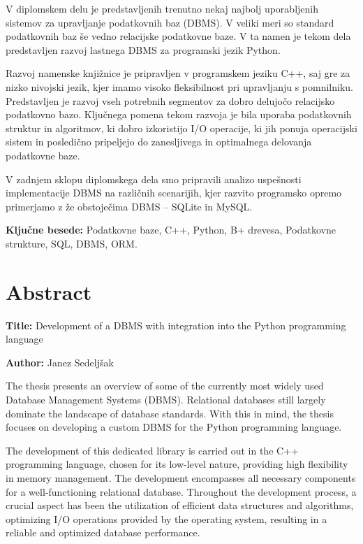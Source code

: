 \documentclass[a4paper,12pt,openright]{book}
\newcommand{\ttitleEn}{Development of a DBMS with integration into the Python programming language}
\newcommand{\tauthor}{Janez Sedeljšak}
\newcommand{\tkeywords}{Podatkovne baze, C++, Python, B+ drevesa, Podatkovne strukture, SQL, DBMS, ORM}
\newcommand{\clearemptydoublepage}{\newpage{\pagestyle{empty}\cleardoublepage}}
\begin{document}
\noindent V diplomskem delu je predstavljenih trenutno nekaj najbolj uporabljenih sistemov za upravljanje podatkovnih baz (DBMS). V veliki meri so standard podatkovnih baz še vedno relacijske podatkovne baze. V ta namen je tekom dela predstavljen razvoj lastnega DBMS za programski jezik Python.

Razvoj namenske knjižnice je pripravljen v programskem jeziku C++, saj gre za nizko nivojski jezik, kjer imamo visoko fleksibilnost pri upravljanju s pomnilniku. Predstavljen je razvoj vseh potrebnih segmentov za dobro delujočo relacijsko podatkovno bazo. Ključnega pomena tekom razvoja je bila uporaba podatkovnih struktur in algoritmov, ki dobro izkoristijo I/O operacije, ki jih ponuja operacijski sistem in posledično pripeljejo do zanesljivega in optimalnega delovanja podatkovne baze.

V zadnjem sklopu diplomskega dela smo pripravili analizo uspešnosti implementacije DBMS na različnih scenarijih, kjer razvito programsko opremo primerjamo z že obstoječima DBMS – SQLite in MySQL.
\bigskip

\noindent\textbf{Ključne besede:} \tkeywords.
\clearemptydoublepage

{}
\chapter*{Abstract}

\noindent\textbf{Title:} \ttitleEn
\bigskip

\noindent\textbf{Author:} \tauthor
\bigskip

\noindent The thesis presents an overview of some of the currently most widely used Database Management Systems (DBMS). Relational databases still largely dominate the landscape of database standards. With this in mind, the thesis focuses on developing a custom DBMS for the Python programming language.

The development of this dedicated library is carried out in the C++ programming language, chosen for its low-level nature, providing high flexibility in memory management. The development encompasses all necessary components for a well-functioning relational database. Throughout the development process, a crucial aspect has been the utilization of efficient data structures and algorithms, optimizing I/O operations provided by the operating system, resulting in a reliable and optimized database performance.
\end{document}
